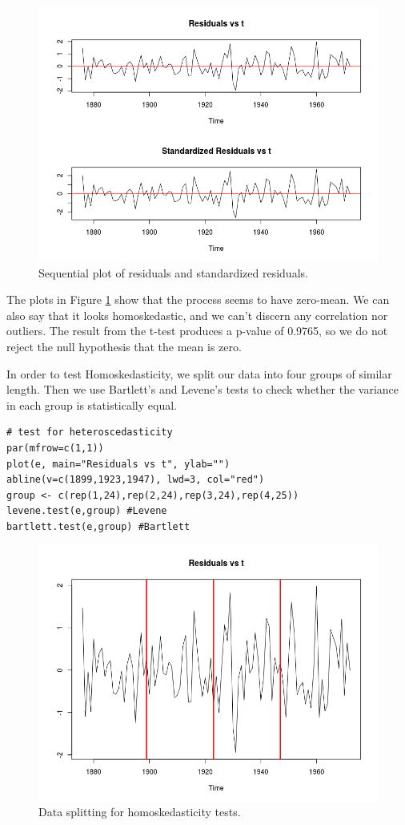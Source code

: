 \documentclass[]{article}
\begin{document}
\begin{figure}[!ht]
\centering
\includegraphics[width=.8\textwidth]{huronseq.png}
\caption{Sequential plot of residuals and standardized residuals.}
\label{huronseq}
\end{figure}

The plots in Figure \ref{huronseq} show that the process seems to have zero-mean. We can also say that it looks homoskedastic, and we can't discern any correlation nor outliers. The result from the t-test produces a p-value of 0.9765, so we do not reject the null hypothesis that the mean is zero.

In order to test Homoskedasticity, we split our data into four groups of similar length. Then we use Bartlett's and Levene's tests to check whether the variance in each group is statistically equal.
\begin{Verbatim}[frame=single]
# test for heteroscedasticity
par(mfrow=c(1,1))
plot(e, main="Residuals vs t", ylab="")
abline(v=c(1899,1923,1947), lwd=3, col="red")
group <- c(rep(1,24),rep(2,24),rep(3,24),rep(4,25))
levene.test(e,group) #Levene 
bartlett.test(e,group) #Bartlett 
\end{Verbatim}

\begin{figure}[!ht]
\centering
\includegraphics[width=.8\textwidth]{huronhomo.png}
\caption{Data splitting for homoskedasticity tests.}
\label{huronhomo}
\end{figure}
\end{document}
